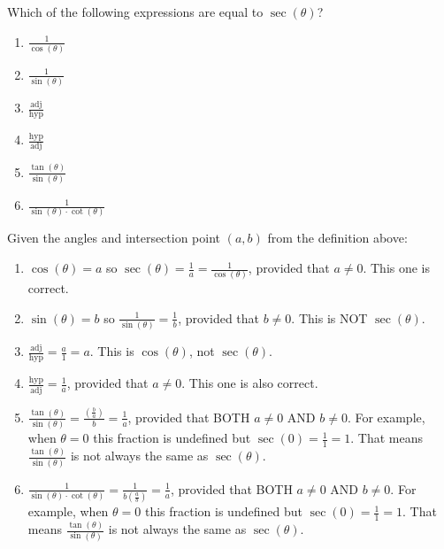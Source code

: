 \documentclass[nooutcomes]{ximera}
\begin{document}
\begin{example}
  Which of the following expressions are equal to $\sec(\theta)$?
  \begin{enumerate}
    \item{$\frac{1}{\cos(\theta)}$}
    \item{$\frac{1}{\sin(\theta)}$}
    \item{$\frac{\text{adj}}{\text{hyp}}$}
    \item{$\frac{\text{hyp}}{\text{adj}}$}
    \item{$\frac{\tan(\theta)}{\sin(\theta)}$}
    \item{$\frac{1}{\sin(\theta)\cdot\cot(\theta)}$}
  \end{enumerate}
  
	  \begin{explanation}
		Given the angles and intersection point $(a,b)$ from the definition above:
		  \begin{enumerate}
		    \item $\cos(\theta) = a$ so $\sec(\theta) = \frac{1}{a} = \frac{1}{\cos(\theta)}$, provided that $a \neq 0$. This one is correct.
		    \item $\sin(\theta) = b$ so $\frac{1}{\sin(\theta)} = \frac{1}{b}$, provided that $b \neq 0$. This is NOT $\sec(\theta)$.
		    \item $\frac{\text{adj}}{\text{hyp}} = \frac{a}{1}=a$. This is $\cos(\theta)$, not $\sec(\theta)$.
		    \item{$\frac{\text{hyp}}{\text{adj}} = \frac{1}{a}$, provided that $a \neq 0$. This one is also correct.}
		    \item $\frac{\tan(\theta)}{\sin(\theta)} = \frac{\left(\frac{b}{a}\right)}{b} = \frac{1}{a}$, provided that BOTH $a \neq 0$ AND $b\neq 0$. For example,
		    		when $\theta = 0$ this fraction is undefined but $\sec(0) = \frac{1}{1} = 1$. That means $\frac{\tan(\theta)}{\sin(\theta)}$ is
		    		not always the same as $\sec(\theta)$.
		    \item $\frac{1}{\sin(\theta)\cdot\cot(\theta)} = \frac{1}{b \left(\frac{a}{b}\right)} = \frac{1}{a}$, provided that BOTH $a \neq 0$ AND $b\neq 0$. For example,
		    		when $\theta = 0$ this fraction is undefined but $\sec(0) = \frac{1}{1} = 1$. That means $\frac{\tan(\theta)}{\sin(\theta)}$ is not
		    		always the same as $\sec(\theta)$.
		  \end{enumerate} 	
	  \end{explanation}
\end{example}
\end{document}

